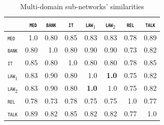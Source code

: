 \documentclass[11pt]{article}
\newcommand{\domain}[1]{\texttt{\textsc{#1}}}
\newcommand{\SB}[1]{\textbf{#1}}
\begin{document}
\begin{table}[h!]
  \centering
  \begin{tabular}{|p{1cm}|*{7}{r|}} \hline
    & \multicolumn{1}{c|}{\domain{ med}} & \multicolumn{1}{c|}{\domain{bank}}& \multicolumn{1}{c|}{\domain{ it }} & \multicolumn{1}{c|}{\domain{law$_1$}} & \multicolumn{1}{c|}{\domain{law$_2$}} & \multicolumn{1}{c|}{\domain{rel}} &\multicolumn{1}{c|}{\domain{talk}} \\ \hline 
    \domain{med} &1.0&0.80&0.85&0.83&0.83&0.78&0.89\\
    \domain{bank} &0.80&1.0&0.80&0.90&0.90&0.73&0.82\\
    \domain{it} &0.85&0.80&1.0&0.80&0.80&0.78&0.85\\
    \domain{law$_1$} &0.83&0.90&0.80&1.0&\SB{1.0}&0.75&0.82\\ 
    \domain{law$_2$} &0.83&0.90&0.80&\SB{1.0}&1.0&0.75&0.82\\ 
    \domain{rel} &0.78&0.73&0.78&0.75&0.75&1.0&0.77\\
    \domain{talk} &0.89&0.82&0.85&0.82&0.82&0.77&1.0\\
    \hline
  \end{tabular}
  \caption{Multi-domain sub-networks' similarities}
  \label{tab:fuzzy-sim}
\end{table}      
\end{document}
